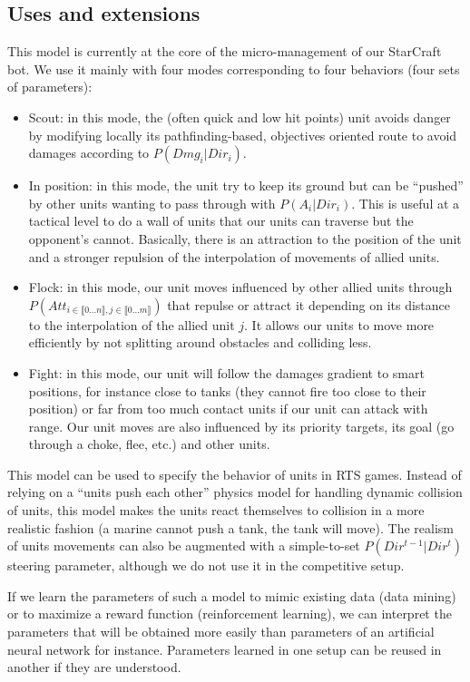 \subsection{Uses and extensions}
This model is currently at the core of the micro-management of our StarCraft bot. We use it mainly with four modes corresponding to four behaviors (four sets of parameters):
\begin{itemize}
\item Scout: in this mode, the (often quick and low hit points) unit avoids danger by modifying locally its pathfinding-based, objectives oriented route to avoid damages according to $P(Dmg_i|Dir_i)$.
\item In position: in this mode, the unit try to keep its ground but can be ``pushed'' by other units wanting to pass through with $P(A_i | Dir_i)$. This is useful at a tactical level to do a wall of units that our units can traverse but the opponent's cannot. Basically, there is an attraction to the position of the unit and a stronger repulsion of the interpolation of movements of allied units.
\item Flock: in this mode, our unit moves influenced by other allied units through $P(Att_{i \in \llbracket 0 \dots n\rrbracket, j \in \llbracket 0 \dots m \rrbracket})$ that repulse or attract it depending on its distance to the interpolation of the allied unit $j$. It allows our units to move more efficiently by not splitting around obstacles and colliding less.
\item Fight: in this mode, our unit will follow the damages gradient to smart positions, for instance close to tanks (they cannot fire too close to their position) or far from too much contact units if our unit can attack with range. Our unit moves are also influenced by its priority targets, its goal (go through a choke, flee, etc.) and other units.
\end{itemize}

This model can be used to specify the behavior of units in RTS games. Instead of relying on a ``units push each other'' physics model for handling dynamic collision of units, this model makes the units react themselves to collision in a more realistic fashion (a marine cannot push a tank, the tank will move). The realism of units movements can also be augmented with a simple-to-set $P(Dir^{t-1}|Dir^t)$ steering parameter, although we do not use it in the competitive setup.

If we learn the parameters of such a model to mimic existing data (data mining) or to maximize a reward function (reinforcement learning), we can interpret the parameters that will be obtained more easily than parameters of an artificial neural network for instance. Parameters learned in one setup can be reused in another if they are understood.

